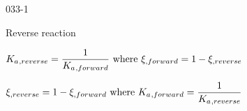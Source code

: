 \begin{mitframe}{033-1}

    
    \begin{listone}
	
    	\item Reverse reaction
    
    	\item $\eqconst{}_{,reverse}=\dfrac{1}{\eqconst{}_{,forward}}~\text{where}~\extent_{,forward}=1-\extent_{,reverse}$
    
		\item $\extent_{,reverse}=1-\extent_{,forward}~\text{where}~ \eqconst{}_{, forward}=\dfrac{1}{\eqconst{}_{,reverse}}$
    
	\end{listone}

\end{mitframe}